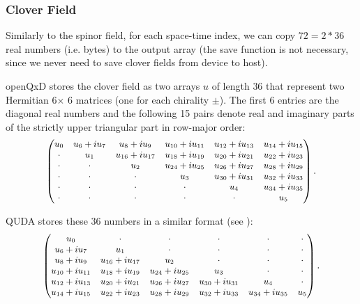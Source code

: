 \subsubsection{Clover Field}

Similarly to the spinor field, for each space-time index, we can copy $72 = 2*36$ real numbers (i.e.  bytes)
to the output array  (the save function is not necessary, since we never need to save clover fields from device to host).

openQxD stores the clover field as two arrays $u$ of length $36$ that represent two Hermitian 6$\times$ 6 matrices (one for each chirality $\pm$). The first $6$ entries are the diagonal real numbers and the following 15 pairs denote real and imaginary parts of the strictly upper triangular part in row-major order:
\newlength{\oldcolsep}
\setlength{\oldcolsep}{\arraycolsep}
\setlength{\arraycolsep}{4pt}
\begin{equation}{\small
\begin{pmatrix}
u_0   & u_6 + iu_7 & u_8 + iu_9       & u_{10} + iu_{11} & u_{12} + iu_{13} & u_{14} + iu_{15} \\
\cdot & u_1        & u_{16} + iu_{17} & u_{18} + iu_{19} & u_{20} + iu_{21} & u_{22} + iu_{23} \\
\cdot & \cdot      & u_2              & u_{24} + iu_{25} & u_{26} + iu_{27} & u_{28} + iu_{29} \\
\cdot & \cdot      & \cdot            & u_3              & u_{30} + iu_{31} & u_{32} + iu_{33} \\
\cdot & \cdot      & \cdot            & \cdot            & u_4              & u_{34} + iu_{35} \\
\cdot & \cdot      & \cdot            & \cdot            & \cdot            & u_5
\end{pmatrix}}\,.
\end{equation}

QUDA stores these 36 numbers in a similar format (see  \cite{QUDApaper}):
\begin{equation}{\small
\begin{pmatrix}
u_0              & \cdot            & \cdot            & \cdot            & \cdot            & \cdot \\
u_6 + iu_7       & u_1              & \cdot            & \cdot            & \cdot            & \cdot \\
u_8 + iu_9       & u_{16} + iu_{17} & u_2              & \cdot            & \cdot            & \cdot \\
u_{10} + iu_{11} & u_{18} + iu_{19} & u_{24} + iu_{25} & u_3              & \cdot            & \cdot \\
u_{12} + iu_{13} & u_{20} + iu_{21} & u_{26} + iu_{27} & u_{30} + iu_{31} & u_4              & \cdot \\
u_{14} + iu_{15} & u_{22} + iu_{23} & u_{28} + iu_{29} & u_{32} + iu_{33} & u_{34} + iu_{35} & u_5
\end{pmatrix}}\,. 
\end{equation}
\setlength{\arraycolsep}{\oldcolsep}

